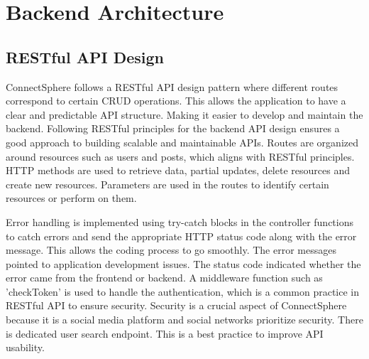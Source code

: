 \section{Backend Architecture}
\subsection{RESTful API Design}
ConnectSphere follows a RESTful API design pattern where different routes correspond to certain CRUD operations. This allows the application to have a clear and predictable API structure. Making it easier to develop and maintain the backend.
Following RESTful principles for the backend API design ensures a good approach to building scalable and maintainable APIs. Routes are organized around resources such as users and posts, which aligns with RESTful principles. HTTP methods are used to retrieve data, partial updates, delete resources  and create new resources. Parameters are used in the routes to identify certain resources or perform on them.

Error handling is implemented using try-catch blocks in the controller functions to catch errors and send the appropriate HTTP status code along with the error message. This allows the coding process to go smoothly. The error messages pointed to application development issues. The status code indicated whether the error came from the frontend or backend. A middleware function such as 'checkToken' is used to handle the authentication, which is a common practice in RESTful API to ensure security. Security is a crucial aspect of ConnectSphere because it is a social media platform and social networks prioritize security. There is dedicated user search endpoint. This is a best practice to improve API usability.    

